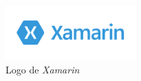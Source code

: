 \begin{figure}[H]
    \centering
    \includegraphics[width=5cm]{Images/Logo_Xamarin.png}
    \caption{Logo de \textit{Xamarin}}
\end{figure}
